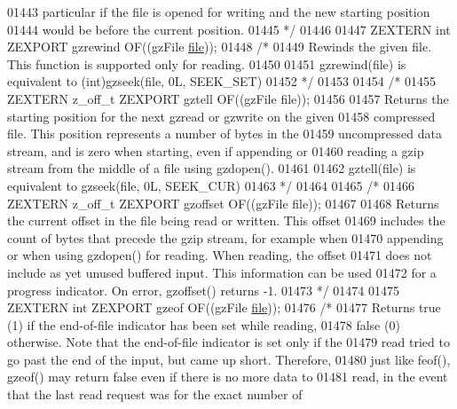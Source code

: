 \begin{DoxyCode}
01443 \textcolor{comment}{   particular if the file is opened for writing and the new starting position}
01444 \textcolor{comment}{   would be before the current position.}
01445 \textcolor{comment}{*/}
01446 
01447 ZEXTERN \textcolor{keywordtype}{int} ZEXPORT    gzrewind OF((gzFile \hyperlink{structfile}{file}));
01448 \textcolor{comment}{/*}
01449 \textcolor{comment}{     Rewinds the given file. This function is supported only for reading.}
01450 \textcolor{comment}{}
01451 \textcolor{comment}{     gzrewind(file) is equivalent to (int)gzseek(file, 0L, SEEK\_SET)}
01452 \textcolor{comment}{*/}
01453 
01454 \textcolor{comment}{/*}
01455 \textcolor{comment}{ZEXTERN z\_off\_t ZEXPORT    gztell OF((gzFile file));}
01456 \textcolor{comment}{}
01457 \textcolor{comment}{     Returns the starting position for the next gzread or gzwrite on the given}
01458 \textcolor{comment}{   compressed file.  This position represents a number of bytes in the}
01459 \textcolor{comment}{   uncompressed data stream, and is zero when starting, even if appending or}
01460 \textcolor{comment}{   reading a gzip stream from the middle of a file using gzdopen().}
01461 \textcolor{comment}{}
01462 \textcolor{comment}{     gztell(file) is equivalent to gzseek(file, 0L, SEEK\_CUR)}
01463 \textcolor{comment}{*/}
01464 
01465 \textcolor{comment}{/*}
01466 \textcolor{comment}{ZEXTERN z\_off\_t ZEXPORT gzoffset OF((gzFile file));}
01467 \textcolor{comment}{}
01468 \textcolor{comment}{     Returns the current offset in the file being read or written.  This offset}
01469 \textcolor{comment}{   includes the count of bytes that precede the gzip stream, for example when}
01470 \textcolor{comment}{   appending or when using gzdopen() for reading.  When reading, the offset}
01471 \textcolor{comment}{   does not include as yet unused buffered input.  This information can be used}
01472 \textcolor{comment}{   for a progress indicator.  On error, gzoffset() returns -1.}
01473 \textcolor{comment}{*/}
01474 
01475 ZEXTERN \textcolor{keywordtype}{int} ZEXPORT gzeof OF((gzFile \hyperlink{structfile}{file}));
01476 \textcolor{comment}{/*}
01477 \textcolor{comment}{     Returns true (1) if the end-of-file indicator has been set while reading,}
01478 \textcolor{comment}{   false (0) otherwise.  Note that the end-of-file indicator is set only if the}
01479 \textcolor{comment}{   read tried to go past the end of the input, but came up short.  Therefore,}
01480 \textcolor{comment}{   just like feof(), gzeof() may return false even if there is no more data to}
01481 \textcolor{comment}{   read, in the event that the last read request was for the exact number of}

\end{DoxyCode}
